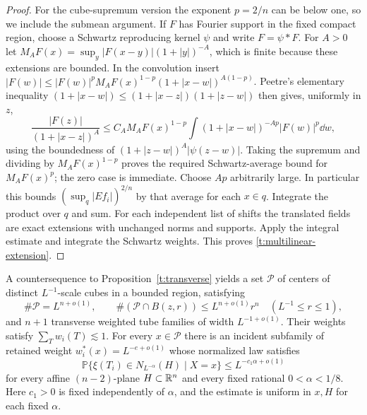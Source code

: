 \begin{proof}
For the cube-supremum version the exponent $p=2/n$ can be below one,
so we include the submean argument.  If $F$ has Fourier support in the
fixed compact region, choose a Schwartz reproducing kernel $\psi$ and
write $F=\psi*F$.  For $A>0$ let
$M_AF(x)=\sup_y|F(x-y)|(1+|y|)^{-A}$, which is finite because these
extensions are bounded.  In the convolution insert
$|F(w)|\le|F(w)|^p M_AF(x)^{1-p}(1+|x-w|)^{A(1-p)}$.
Peetre's elementary inequality
$(1+|x-w|)\le(1+|x-z|)(1+|z-w|)$ then gives, uniformly in $z$,
\[
 \frac{|F(z)|}{(1+|x-z|)^A}
 \le C_A M_AF(x)^{1-p}
             \int(1+|x-w|)^{-Ap}|F(w)|^p\dd w,
\]
using the boundedness of $(1+|z-w|)^A|\psi(z-w)|$.
Taking the supremum and dividing by $M_AF(x)^{1-p}$ proves the
required Schwartz-average bound for $M_AF(x)^p$; the zero case is
immediate.  Choose $Ap$ arbitrarily large.  In particular this bounds
$(\sup_q|Ef_i|)^{2/n}$ by that average for each $x\in q$.
Integrate the product over $q$ and sum.  For each independent list of
shifts the translated fields are exact extensions with unchanged norms
and supports.  Apply the integral estimate and integrate the Schwartz
weights.  This proves \eqref{t:multilinear-extension}.
\end{proof}

\begin{lemma}\label{t:tubes}
A countersequence to Proposition~\ref{t:transverse} yields a set
$\mathcal P$ of centers of distinct $L^{-1}$-scale cubes in a bounded
region, satisfying
\begin{equation}\label{t:point-counts}
 \#\mathcal P=L^{n+o(1)},\qquad
 \#(\mathcal P\cap B(z,r))\le L^{n+o(1)}r^n
                     \quad(L^{-1}\le r\le1),
\end{equation}
and $n+1$ transverse weighted tube families of width $L^{-1+o(1)}$.
Their weights satisfy $\sum_Tw_i(T)\lesssim1$.  For every $x\in\mathcal P$
there is an incident subfamily of retained weight
$w_i^*(x)=L^{-e+o(1)}$ whose normalized law satisfies
\begin{equation}\label{t:strip-law}
 \mathbb P\{\xi(T_i)\in N_{L^{-\alpha}}(H)\mid X=x\}
       \le L^{-c_1\alpha+o(1)}
\end{equation}
for every affine $(n-2)$-plane $H\subset\mathbb R^n$ and every fixed rational
$0<\alpha<1/8$.  Here $c_1>0$ is fixed independently of $\alpha$, and
the estimate is uniform in $x,H$ for each fixed $\alpha$.
\end{lemma}

